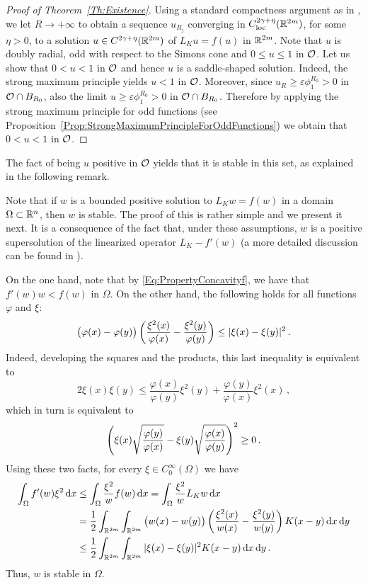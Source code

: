\begin{proof}[Proof of Theorem~\ref{Th:Existence}]
	Using a standard compactness argument as in \cite{FelipeSanz-Perela:IntegroDifferentialI}, we let $R\to +\infty$ to obtain a sequence $u_{R_j}$ converging in $C^{2\gamma + \eta}_{\mathrm{loc}}(\mathbb{R}^{2m})$, for some $\eta > 0$, to a solution $u \in C^{2\gamma + \eta}(\mathbb{R}^{2m})$ of $L_K u = f(u)$ in $\mathbb{R}^{2m}$. Note that $u$ is doubly radial, odd with respect to the Simons cone and $0\leq u \leq 1$ in $\mathcal{O}$. Let us show that $0 < u < 1$ in $\mathcal{O}$ and hence $u$ is a saddle-shaped solution. Indeed, the strong maximum principle yields $u<1$ in $\mathcal{O}$. Moreover, since $u_R\geq\varepsilon \phi_1^{R_0}>0$ in  $\mathcal{O} \cap B_{R_0}$, also the limit $u\geq\varepsilon \phi_1^{R_0}>0$ in  $\mathcal{O} \cap B_{R_0}$. Therefore by applying the strong maximum principle for odd functions (see Proposition~\ref{Prop:StrongMaximumPrincipleForOddFunctions}) we obtain that $0 < u < 1$ in $\mathcal{O}$.
\end{proof}




The fact of being $u$ positive in $\mathcal{O}$ yields that it is stable in this set, as explained in the following remark. 


\begin{remark}
	\label{Remark:Stability}
	Note that if $w$ is a bounded positive solution to $L_K w = f(w)$ in a domain $\Omega\subset \mathbb{R}^n$, then $w$ is stable. The proof of this is rather simple and we present it next. It is a consequence of the fact that, under these assumptions, $w$ is a positive supersolution of the linearized operator $L_K - f'(w)$ (a more detailed discussion can be found in \cite{HamelRosOtonSireValdinoci}). 
	
	On the one hand, note that by \eqref{Eq:PropertyConcavityf}, we have that $f'(w)w<f(w)$ in $\Omega$. On the other hand, the following holds for all functions $\varphi$ and $\xi$:
	\begin{equation}
	\label{Eq:IdentityStability}
	\big (\varphi(x) - \varphi(y) \big) \left ( {\dfrac{\xi^2(x)}{\varphi(x)} - \dfrac{\xi^2(y)}{\varphi(y)} }\right ) \leq |\xi (x) - \xi(y)|^2\,.
	\end{equation}
	Indeed, developing the squares and the products, this last inequality is equivalent to
	$$
	2 \xi(x) \xi(y) \leq \dfrac{\varphi(x)}{\varphi(y)} \xi^2(y) +  \dfrac{\varphi(y)}{\varphi(x)} \xi^2 (x)\,,
	$$
	which in turn is equivalent to
	$$
	\left ( {\xi (x)\sqrt{\dfrac{\varphi(y)}{\varphi(x)}} - \xi(y) \sqrt{\dfrac{\varphi(x)}{\varphi(y)} } }\right )^2 \geq 0\,.
	$$
	Using these two facts, for every $\xi\in C^\infty_0(\Omega)$ we have
	\begin{align*}
	\int_\Omega f'(w) \xi^2 \,\mathrm{d} x & \leq \int_\Omega  \dfrac{\xi^2}{w} f(w) \,\mathrm{d} x = \int_\Omega  \dfrac{\xi^2}{w} L_Kw \,\mathrm{d} x \\ 
	&= \dfrac{1}{2} \int_{\mathbb{R}^{2m}} \int_{\mathbb{R}^{2m}} \big ( w(x) - w(y) \big) \left ( {\dfrac{\xi^2(x)}{w(x)} - \dfrac{\xi^2(y)}{w(y)} }\right ) K(x - y) \,\mathrm{d} x \,\mathrm{d} y
	\\ 
	&\leq \dfrac{1}{2} \int_{\mathbb{R}^{2m}} \int_{\mathbb{R}^{2m}} |\xi (x) - \xi(y)|^2 K(x - y) \,\mathrm{d} x \,\mathrm{d} y\,.
	\end{align*}
	Thus, $w$ is stable in $\Omega$.	
\end{remark}


